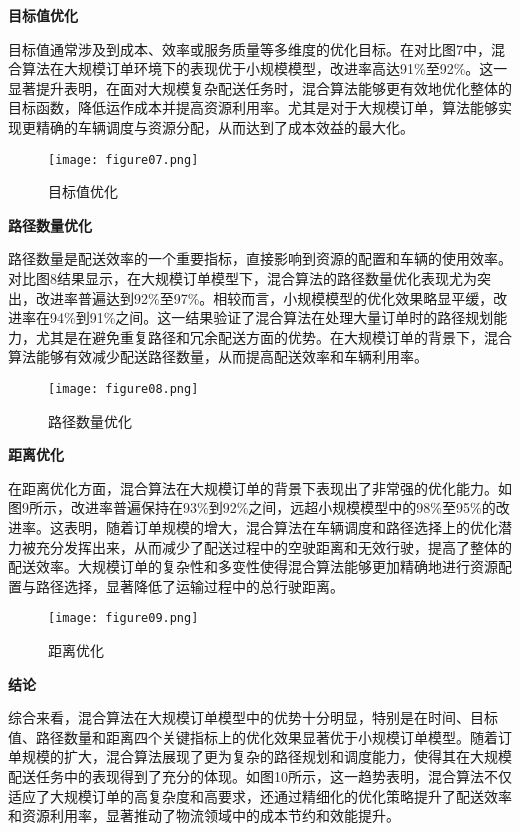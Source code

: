 \documentclass[12pt,a4paper,twoside]{ctexbook}
\begin{document}
\textbf{目标值优化}

目标值通常涉及到成本、效率或服务质量等多维度的优化目标。在对比图7中，混合算法在大规模订单环境下的表现优于小规模模型，改进率高达91\%至92\%。这一显著提升表明，在面对大规模复杂配送任务时，混合算法能够更有效地优化整体的目标函数，降低运作成本并提高资源利用率。尤其是对于大规模订单，算法能够实现更精确的车辆调度与资源分配，从而达到了成本效益的最大化。

\begin{figure}[H]
    \centering
    \texttt{[image: figure07.png]} %
    \caption{目标值优化}
    \label{fig:objective_optimization}
\end{figure}

\textbf{路径数量优化}

路径数量是配送效率的一个重要指标，直接影响到资源的配置和车辆的使用效率。对比图8结果显示，在大规模订单模型下，混合算法的路径数量优化表现尤为突出，改进率普遍达到92\%至97\%。相较而言，小规模模型的优化效果略显平缓，改进率在94\%到91\%之间。这一结果验证了混合算法在处理大量订单时的路径规划能力，尤其是在避免重复路径和冗余配送方面的优势。在大规模订单的背景下，混合算法能够有效减少配送路径数量，从而提高配送效率和车辆利用率。

\begin{figure}[H]
    \centering
    \texttt{[image: figure08.png]} %
    \caption{路径数量优化}
    \label{fig:route_optimization}
\end{figure}

\textbf{距离优化}

在距离优化方面，混合算法在大规模订单的背景下表现出了非常强的优化能力。如图9所示，改进率普遍保持在93\%到92\%之间，远超小规模模型中的98\%至95\%的改进率。这表明，随着订单规模的增大，混合算法在车辆调度和路径选择上的优化潜力被充分发挥出来，从而减少了配送过程中的空驶距离和无效行驶，提高了整体的配送效率。大规模订单的复杂性和多变性使得混合算法能够更加精确地进行资源配置与路径选择，显著降低了运输过程中的总行驶距离。

\begin{figure}[H]
    \centering
    \texttt{[image: figure09.png]} %
    \caption{距离优化}
    \label{fig:distance_optimization}
\end{figure}

\textbf{结论}

综合来看，混合算法在大规模订单模型中的优势十分明显，特别是在时间、目标值、路径数量和距离四个关键指标上的优化效果显著优于小规模订单模型。随着订单规模的扩大，混合算法展现了更为复杂的路径规划和调度能力，使得其在大规模配送任务中的表现得到了充分的体现。如图10所示，这一趋势表明，混合算法不仅适应了大规模订单的高复杂度和高要求，还通过精细化的优化策略提升了配送效率和资源利用率，显著推动了物流领域中的成本节约和效能提升。
\end{document}
